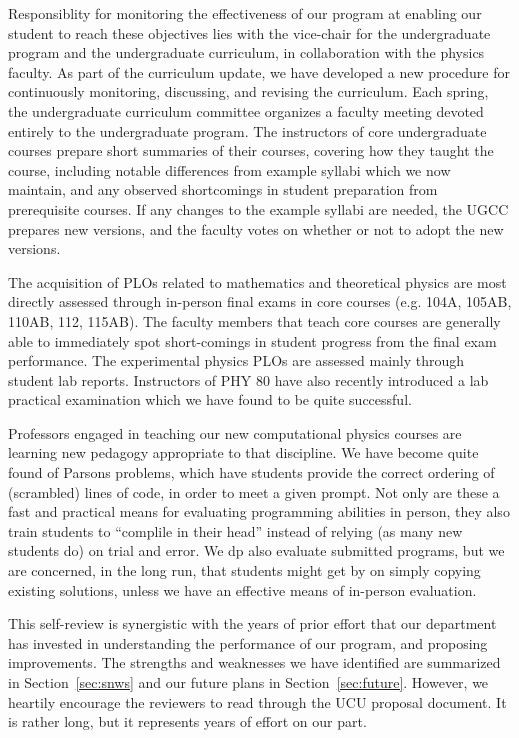 \documentclass[12pt]{article}
\begin{document}
Responsiblity for monitoring the effectiveness of our program at
enabling our student to reach these objectives lies with the
vice-chair for the undergraduate program and the undergraduate
curriculum, in collaboration with the physics faculty.  As part of the
curriculum update, we have developed a new procedure for continuously
monitoring, discussing, and revising the curriculum.  Each spring, the
undergraduate curriculum committee organizes a faculty meeting devoted
entirely to the undergraduate program.  The instructors of core
undergraduate courses prepare short summaries of their courses,
covering how they taught the course, including notable differences
from example syllabi which we now maintain, and any observed
shortcomings in student preparation from prerequisite courses.  If any
changes to the example syllabi are needed, the UGCC prepares new
versions, and the faculty votes on whether or not to adopt the new
versions.

The acquisition of PLOs related to mathematics and theoretical physics
are most directly assessed through in-person final exams in core
courses (e.g. 104A, 105AB, 110AB, 112, 115AB).  The faculty members
that teach core courses are generally able to immediately spot
short-comings in student progress from the final exam performance.
The experimental physics PLOs are assessed mainly through student lab
reports.  Instructors of PHY 80 have also recently introduced a lab
practical examination which we have found to be quite successful.

Professors engaged in teaching our new computational physics courses
are learning new pedagogy appropriate to that discipline.  We have
become quite found of Parsons problems, which have students provide
the correct ordering of (scrambled) lines of code, in order to meet a
given prompt.  Not only are these a fast and practical means for
evaluating programming abilities in person, they also train students
to ``complile in their head'' instead of relying (as many
new students do) on trial and error.  We dp also evaluate submitted
programs, but we are concerned, in the long run, that students might
get by on simply copying existing solutions, unless we have an
effective means of in-person evaluation.

This self-review is synergistic with the years of prior effort that
our department has invested in understanding the performance of our
program, and proposing improvements.  The strengths and weaknesses we
have identified are summarized in Section~\ref{sec:snws} and our
future plans in Section~\ref{sec:future}.  However, we heartily
encourage the reviewers to read through the UCU proposal document.  It
is rather long, but it represents years of effort on our part.\\[3pt]
\end{document}
